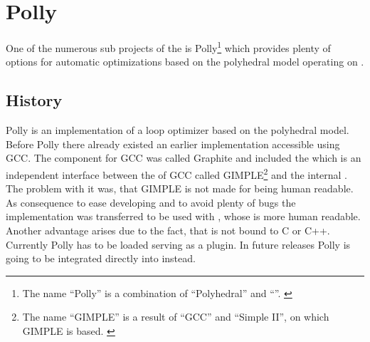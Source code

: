 \chapter{Polly}
One of the numerous sub projects of the \llvm is Polly\footnote{The name \enquote{Polly} is a combination of \enquote{Polyhedral} and \enquote{\llvm}. \cite{PollyGrosser}} which provides plenty of options for automatic optimizations based on the polyhedral model operating on \llvmir.

\section{History}
Polly is an implementation of a loop optimizer based on the polyhedral model.\\
Before Polly there already existed an earlier implementation accessible using GCC.
The component for GCC was called Graphite \cite{gccGraphite} and included the \pcp \cite{grosserGraphite, grosserGraphiteDesign} which is an independent interface between the \ir of GCC called GIMPLE\footnote{The name \enquote{GIMPLE} is a result of \enquote{GCC} and \enquote{Simple II}, on which GIMPLE is based. \cite{GenericGimple}} and the internal \ir \gpoly.
The problem with it was, that GIMPLE is not made for being human readable.
As consequence to ease developing and to avoid plenty of bugs the implementation was transferred to be used with \llvm, whose \ir is more human readable.
Another advantage arises due to the fact, that \llvm is not bound to C or C++.
Currently Polly has to be loaded serving as a \llvm plugin.
In future releases Polly is going to be integrated directly into \llvm instead.

